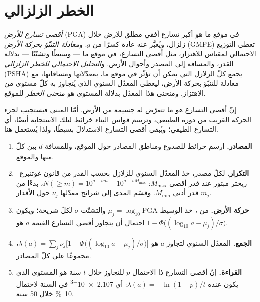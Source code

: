 \section{الخطر الزلزالي}\label{sec:b2:geological-hazards:seismic}

\begin{definition}\label{def:b2:geological-hazards:psha}
\emph{أقصى تسارع للأرض} (PGA) في موقع ما هو أكبر
تسارع أفقي مطلق للأرض خلال زلزال، ويُعبَّر عنه عادة
كسرًا من $g$. و\emph{معادلة التنبّؤ بحركة الأرض}
(GMPE) تعطي التوزيع الاحتمالي لمقياس للاهتزاز، مثل أقصى التسارع، في
موقع ما --- وسيطًا وتشتّتًا --- بدلالة القدر، والمسافة إلى المصدر
وأحوال الأرض. و\emph{التحليل الاحتمالي للخطر الزلزالي}
(PSHA) يجمع كلّ الزلازل التي يمكن أن تؤثّر في موقع ما، بمعدّلاتها ومسافاتها،
مع معادلة للتنبّؤ بحركة الأرض، ليعطي المعدّل السنوي الذي يُتجاوز به كلّ مستوى من الاهتزاز.
ومنحنى هذا المعدّل بدلالة المستوى هو \emph{منحنى
الخطر} للموقع.
\end{definition}

إنّ أقصى التسارع هو ما تتعرّض له جسيمة من الأرض. أمّا المبنى فيستجيب لجزء الحركة
القريب من دوره الطبيعي، وترسم قوانين البناء خرائط لتلك الاستجابة أيضًا، أي التسارع الطيفي؛
ويُبقي أقصى التسارع الاستدلالَ بسيطًا، ولذا يُستعمل هنا.

\begin{method}\label{met:b2:geological-hazards:psha}
\begin{enumerate}
  \item \textbf{المصادر.} ارسم خرائط للصدوع ومناطق المصادر حول الموقع، وللمسافة $d$ بين
        كلّ منها والموقع.
  \item \textbf{التكرار.} لكلّ مصدر، خذ المعدّل السنوي للزلازل بحسب القدر
        من قانون غوتنبرغ--ريختر مبتور عند قدر أقصى $M_{\max}$:
        $N(\geq m) = 10^{a - bm} - 10^{a - bM_{\max}}$، بدءًا من قدر أدنى $M_{\min}$.
        وقسّم المدى إلى شرائح معدّلها $\nu_j$ حول الأقدار $m_j$.
  \item \textbf{حركة الأرض.} من ، خذ الوسيط $\mu_j = \log_{10}\mathrm{PGA}$
        والتشتّت $\sigma$ لكلّ شريحة؛ ويكون احتمال أن يتجاوز أقصى التسارع القيمة $a$ هو
        $1 - \Phi\bigl((\log_{10} a - \mu_j)/\sigma\bigr)$.
  \item \textbf{الجمع.} المعدّل السنوي لتجاوز $a$ هو $\lambda(a) = \sum_j \nu_j
        \bigl[1 - \Phi\bigl((\log_{10} a - \mu_j)/\sigma\bigr)\bigr]$، مجموعًا على كلّ المصادر.
  \item \textbf{القراءة.} إنّ أقصى التسارع ذا الاحتمال $p$ للتجاوز خلال $t$ سنة هو المستوى الذي
        يكون عنده $\lambda(a) = -\ln(1 - p)/t$: أي \num{2.107e-3} في السنة لاحتمال \qty{10}{\percent} خلال 50 سنة.
\end{enumerate}
\end{method}

